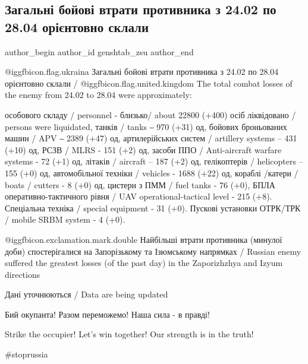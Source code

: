  
 
 
 
 
 
\subsection{Загальні бойові втрати противника з 24.02 по 28.04 орієнтовно склали}
\label{sec:28_04_2022.fb.genshtab_zsu.1.vtraty}
 
\ifcmt
 author_begin
   author_id genshtab_zsu
 author_end
\fi

@igg{fbicon.flag.ukraina}  Загальні бойові втрати противника з 24.02 по 28.04
орієнтовно склали / @igg{fbicon.flag.united.kingdom} The total combat losses of the enemy from 24.02 to
28.04 were approximately:


\obeycr
особового складу / personnel - близько/ about 22800 (+400) осіб ліквідовано / persons were liquidated, 
танків / tanks ‒ 970 (+31) од, 
бойових броньованих машин / APV  ‒ 2389 (+47) од, 
артилерійських систем / artillery systems – 431 (+10) од, 
РСЗВ / MLRS - 151 (+2) од, 
засоби ППО / Anti-aircraft warfare systems - 72 (+1) од,
літаків / aircraft – 187 (+2) од, 
гелікоптерів / helicopters – 155 (+0) од, 
автомобільної техніки / vehicles - 1688 (+22) од,
кораблі /катери / boats / cutters - 8 (+0) од,
цистерн з ПММ / fuel tanks - 76 (+0), 
БПЛА оперативно-тактичного рівня / UAV operational-tactical level - 215 (+8).
Спеціальна техніка / special equipment - 31 (+0).
Пускові установки ОТРК/ТРК / mobile SRBM system - 4 (+0).
\restorecr

@igg{fbicon.exclamation.mark.double} Найбільші втрати противника (минулої доби)
спостерігалися на Запорізькому та Ізюмському напрямках / Russian enemy suffered
the greatest losses (of the past day) in the  Zaporizhzhya and Izyum directions

Дані уточнюються / Data are being updated

Бий окупанта! Разом переможемо! Наша сила - в правді!

Strike the occupier! Let's win together! Our strength is in the truth!

\#stoprussia
